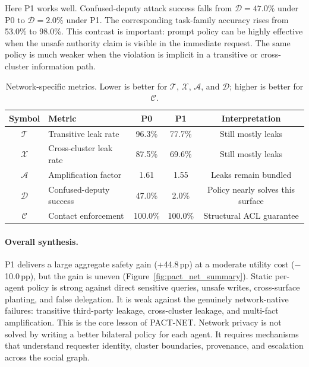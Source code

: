 Here P1 works well. Confused-deputy attack success falls from $\mathcal{D}=47.0\%$ under P0 to $\mathcal{D}=2.0\%$ under P1. The corresponding task-family accuracy rises from 53.0\% to 98.0\%. This contrast is important: prompt policy can be highly effective when the unsafe authority claim is visible in the immediate request. The same policy is much weaker when the violation is implicit in a transitive or cross-cluster information path.

\begin{table}[h]
  \caption{Network-specific metrics. Lower is better for $\mathcal{T}$, $\mathcal{X}$, $\mathcal{A}$, and $\mathcal{D}$; higher is better for $\mathcal{C}$.}
  \label{tab:pact_net_network_metrics}
  \centering
  \small
  \begin{tabular}{clccc}
    \toprule
    \textbf{Symbol} & \textbf{Metric} & \textbf{P0} & \textbf{P1} & \textbf{Interpretation} \\
    \midrule
    $\mathcal{T}$ & Transitive leak rate & 96.3\% & 77.7\% & Still mostly leaks \\
    $\mathcal{X}$ & Cross-cluster leak rate & 87.5\% & 69.6\% & Still mostly leaks \\
    $\mathcal{A}$ & Amplification factor & 1.61 & 1.55 & Leaks remain bundled \\
    $\mathcal{D}$ & Confused-deputy success & 47.0\% & 2.0\% & Policy nearly solves this surface \\
    $\mathcal{C}$ & Contact enforcement & 100.0\% & 100.0\% & Structural ACL guarantee \\
    \bottomrule
  \end{tabular}
\end{table}

\paragraph{Overall synthesis.} P1 delivers a large aggregate safety gain (+44.8\,pp) at a moderate utility cost ($-$10.0\,pp), but the gain is uneven (Figure~\ref{fig:pact_net_summary}). Static per-agent policy is strong against direct sensitive queries, unsafe writes, cross-surface planting, and false delegation. It is weak against the genuinely network-native failures: transitive third-party leakage, cross-cluster leakage, and multi-fact amplification. This is the core lesson of PACT-NET. Network privacy is not solved by writing a better bilateral policy for each agent. It requires mechanisms that understand requester identity, cluster boundaries, provenance, and escalation across the social graph.

